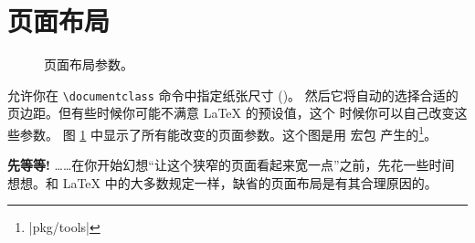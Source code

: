 \section{页面布局}

\begin{figure}[!hp]
\begin{center}
\makeatletter\@mylayout\makeatother
\end{center}
\vspace*{1.8cm}
\caption{页面布局参数。}
\label{fig:layout}
\end{figure}
\LaTeXe{} 允许你在 \verb|\documentclass| 命令中指定纸张尺寸 ()。
然后它将自动的选择合适的页边距。但有些时候你可能不满意 \LaTeX{} 的预设值，这个
时候你可以自己改变这些参数。
\thispagestyle{fancyplain}
图 \ref{fig:layout} 中显示了所有能改变的页面参数。这个图是用  宏包
产生的\footnote{\CTANref|pkg/tools|}。

\textbf{先等等!} ……在你开始幻想“让这个狭窄的页面看起来宽一点”之前，先花一些时间
想想。和 \LaTeX{} 中的大多数规定一样，缺省的页面布局是有其合理原因的。

